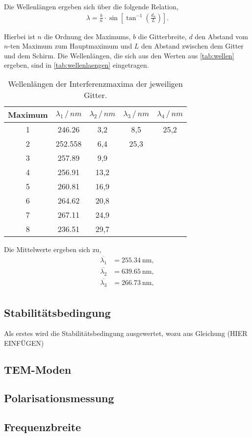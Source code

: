\noindent
Die Wellenlängen ergeben sich über die folgende Relation,
\begin{align}
  \lambda = \frac{b}{n}\cdot\sin\left[\tan^{-1}\left(\frac{d_n}{L}\right)\right].
\end{align}

\noindent
Hierbei ist $n$ die Ordnung des Maximums, $b$ die Gitterbreite, $d$ den Abstand vom $n$-ten Maximum zum Hauptmaximum und $L$ den Abstand zwischen dem Gitter und dem Schirm.
Die Wellenlängen, die sich aus den Werten aus \autoref{tab:wellen} ergeben, sind in \autoref{tab:wellenlaengen} eingetragen.

\begin{table}[H]
  \centering
  \caption{Wellenlängen der Interferenzmaxima der jeweiligen Gitter.}
  \label{tab:wellenlaengen}
  \begin{tabular}{c c c c c}
      \toprule
      Maximum & $\lambda_1 \,/\,\si{nm}$ & $\lambda_2 \,/\,\si{nm}$ & $\lambda_3 \,/\,\si{nm}$ & $\lambda_4 \,/\,\si{nm}$\\
      \midrule
      1 & 246.26 & 3,2   & 8,5   & 25,2  \\  
      2 & 252.558 & 6,4   & 25,3  &       \\  
      3 & 257.89 & 9,9   &       &       \\  
      4 & 256.91 & 13,2 &       &       \\
      5 & 260.81 & 16,9 &       &       \\
      6 & 264.62 & 20,8 &       &       \\
      7 & 267.11 & 24,9 &       &       \\
      8 & 236.51 & 29,7 &       &       \\
      \bottomrule
  \end{tabular}
\end{table}



Die Mittelwerte ergeben sich zu,
\begin{align}
  \overline{\lambda_1} &= \SI{255.34}{\nano\meter}, \\
  \overline{\lambda_2} &= \SI{639.65}{\nano\meter}, \\
  \overline{\lambda_3} &= \SI{266.73}{\nano\meter}, \\
\end{align}

\subsection{Stabilitätsbedingung}
\label{subsec:Stabilitätsbedingung}
Als erstes wird die Stabilitätsbedingung ausgewertet, wozu aus Gleichung (HIER EINFÜGEN)


\subsection{TEM-Moden}
\label{subsec:TEM}


\subsection{Polarisationsmessung}
\label{subsec:Polarisationsmessung}

\subsection{Frequenzbreite}
\label{subsec:Frequenzbreite}


